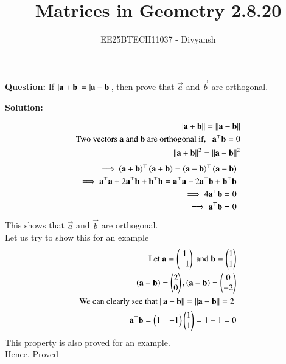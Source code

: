 \documentclass[journal,12pt,onecolumn]{IEEEtran}
\title{Matrices in Geometry 2.8.20}
\author{EE25BTECH11037 - Divyansh}
\theoremstyle{remark}
\begin{document}
\vspace{3cm}
\maketitle
{\let\newpage\relax\maketitle}
\textbf{Question: }
If $\left\vert\mathbf{a}+\mathbf{b}\right\vert=\left\vert\mathbf{a}-\mathbf{b}\right\vert$, then prove that $\vec{a}$ and $\vec{b}$ are orthogonal.
\vspace{2mm}

\textbf{Solution:}
 
\begin{align}
    \norm{\vec{a}+\vec{b}}=\norm{\vec{a}-\vec{b}}\\
    \text{Two vectors $\vec{a}$ and $\vec{b}$ are orthogonal if,} \ \ \ \vec{a}^{\top}\vec{b}=0\\
    \norm{\vec{a}+\vec{b}}^2=\norm{\vec{a}-\vec{b}}^2 
\end{align}
\begin{align}
    \implies \left(\mathbf{a}+\mathbf{b}\right)^{\top}\left(\mathbf{a}+\mathbf{b}\right)= \left(\mathbf{a}-\mathbf{b}\right)^{\top}\left(\mathbf{a}-\mathbf{b}\right)\\
    \implies \mathbf{a}^{\top}\mathbf{a} + 2\mathbf{a}^{\top}\mathbf{b}+ \mathbf{b}^{\top}\mathbf{b}=\mathbf{a}^{\top}\mathbf{a} - 2\mathbf{a}^{\top}\mathbf{b}+ \mathbf{b}^{\top}\mathbf{b}\\
    \implies 4\mathbf{a}^{\top}\mathbf{b}=0\\
    \implies \mathbf{a}^{\top}\mathbf{b}=0
\end{align}
This shows that $\vec{a}$ and $\vec{b}$ are orthogonal.\\
Let us try to show this for an example\\
\begin{align}
\text{Let } \mathbf{a}=\begin{pmatrix}1 \\ -1\end{pmatrix} \text{ and } \mathbf{b}=\begin{pmatrix}1 \\ 1\end{pmatrix}\\
\left(\mathbf{a+b}\right)=\begin{pmatrix}2 \\ 0\end{pmatrix}, \left(\mathbf{a-b}\right)=\begin{pmatrix}0\\-2\end{pmatrix}\\
\text{We can clearly see that  $\left\lVert\mathbf{a}+\mathbf{b}\right\rVert=\left\lVert\mathbf{a}-\mathbf{b}\right\rVert=2$ }\\
\mathbf{a}^{\top}\mathbf{b}=\begin{pmatrix}1 & -1\end{pmatrix}\begin{pmatrix}1 \\ 1\end{pmatrix}=1-1 = 0
\end{align}
This property is also proved for an example.\\
Hence, Proved
\end{document}
